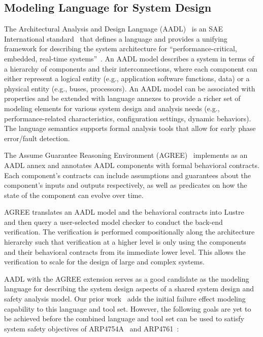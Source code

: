 \subsection{Modeling Language for System Design}
\label{subsec:aadl-agree}
The Architectural Analysis and Design Language (AADL)~\cite{FeilerModelBasedEngineering2012} is an SAE International standard~\cite{AADL_Standard} that defines a language and provides a unifying framework for describing the system architecture for ``performance-critical, embedded, real-time systems''~\cite{AADL_Standard}. An AADL model describes a system in terms of a hierarchy of components and their interconnections, where each component can either represent a logical entity (e.g., application software functions, data) or a physical entity (e.g., buses, processors). An AADL model can be associated with properties and be extended with language annexes to provide a richer set of modeling elements for various system design and analysis needs (e.g., performance-related characteristics, configuration settings, dynamic behaviors). The language semantics supports formal analysis tools that allow for early phase error/fault detection.

The Assume Guarantee Reasoning
Environment (AGREE)~\cite{NFM2012:CoGaMiWhLaLu} implements as an AADL annex and annotates AADL components with formal behavioral contracts. Each component's contracts can include assumptions and guarantees about the component's inputs and outputs respectively, as well as predicates on how the state of the component can evolve over time.

AGREE translates an AADL model and the behavioral contracts into Lustre~\cite{Halbwachs91:IEEE} and then query a user-selected
model checker to conduct the back-end verification. The verification is performed compositionally along the architecture hierarchy such that verification at a higher level is only using the components and their behavioral contracts from its immediate lower level. This allows the verification to scale for the design of large and complex systems. 

AADL with the AGREE extension serves as a good candidate as the modeling language for describing the system design aspects of a shared system design and safety analysis model. Our prior work~\cite{Stewart17:IMBSA} adds the initial failure effect modeling capability to this language and tool set. However, the following goals are yet to be achieved before the combined language and tool set can be used to satisfy system safety objectives of ARP4754A~\cite{SAE:ARP4754A} and ARP4761~\cite{SAE:ARP4761}:

